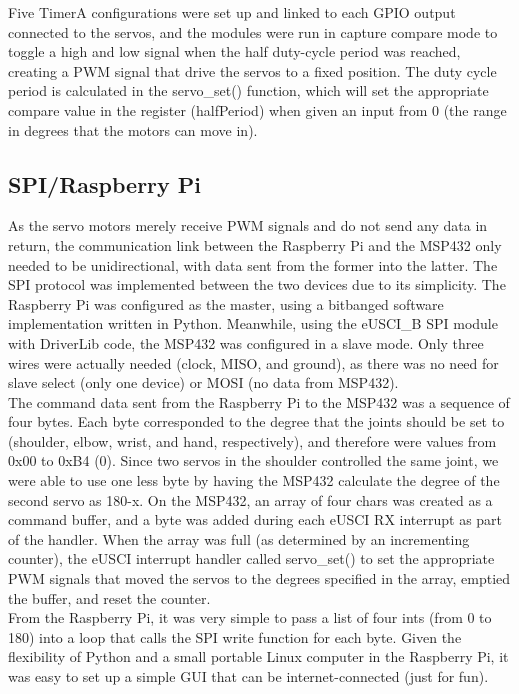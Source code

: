 \documentclass[10pt]{article}
\begin{document}
Five TimerA configurations were set up and linked to each GPIO output connected to the servos, and the modules were run in capture compare mode to toggle a high and low signal when the half duty-cycle period was reached, creating a PWM signal that drive the servos to a fixed position. The duty cycle period is calculated in the servo\_set() function, which will set the appropriate compare value in the register (halfPeriod) when given an input from 0 (the range in degrees that the motors can move in).

\subsection{SPI/Raspberry Pi}

As the servo motors merely receive PWM signals and do not send any data in return, the communication link between the Raspberry Pi and the MSP432 only needed to be unidirectional, with data sent from the former into the latter. 
The SPI protocol was implemented between the two devices due to its simplicity. The Raspberry Pi was configured as the master, using a bitbanged software implementation written in Python. Meanwhile, using the eUSCI\_B SPI module with DriverLib code, the MSP432 was configured in a slave mode. Only three wires were actually needed (clock, MISO, and ground), as there was no need for slave select (only one device) or MOSI (no data from MSP432). \\ \newline
The command data sent from the Raspberry Pi to the MSP432 was a sequence of four bytes. Each byte corresponded to the degree that the joints should be set to (shoulder, elbow, wrist, and hand, respectively), and therefore were values from 0x00 to 0xB4 (0). Since two servos in the shoulder controlled the same joint, we were able to use one less byte by having the MSP432 calculate the degree of the second servo as 180\--x. On the MSP432, an array of four chars was created as a command buffer, and a byte was added during each eUSCI RX interrupt as part of the handler. When the array was full (as determined by an incrementing counter), the eUSCI interrupt handler called servo\_set() to set the appropriate PWM signals that moved the servos to the degrees specified in the array, emptied the buffer, and reset the counter. \\ \newline
From the Raspberry Pi, it was very simple to pass a list of four ints (from 0 to 180) into a loop that calls the SPI write function for each byte. Given the flexibility of Python and a small portable Linux computer in the Raspberry Pi, it was easy to set up a simple GUI that can be internet-connected (just for fun).
\end{document}
